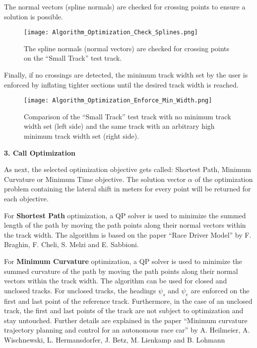 The normal vectors (spline normals) are checked for crossing points to ensure a solution is possible.
\begin{figure}[H]
    \centering
    \texttt{[image: Algorithm\_Optimization\_Check\_Splines.png]}
    \caption{The spline normals (normal vectors) are checked for crossing points on the ``Small Track'' test track.}
    \label{fig:Optimization Algorithm Check Spline Normals for Crossing Points}
\end{figure}
Finally, if no crossings are detected, the minimum track width set by the user is enforced by inflating tighter sections until the desired track width is reached.
\begin{figure}[H]
    \centering
    \texttt{[image: Algorithm\_Optimization\_Enforce\_Min\_Width.png]}
    \caption{Comparison of the ``Small Track'' test track with no minimum track width set (left side) and the same track with an arbitrary high minimum track width set (right side).}
    \label{fig:Optimization Algorithm Enforce minimum width}
\end{figure}

\pagebreak

\textbf{3. Call Optimization}

As next, the selected optimization objective gets called: Shortest Path, Minimum Curvature or Minimum Time objective. The solution vector $\alpha$ of the optimization problem containing the lateral shift in meters for every point will be returned for each objective.

For \textbf{Shortest Path} optimization, a QP solver is used to minimize the summed length of the path by moving the path points along their normal vectors within the track width. The algorithm is based on the paper ``Race Driver Model'' by F. Braghin, F. Cheli, S. Melzi and E. Sabbioni. \cite{shortest_path}

For \textbf{Minimum Curvature} optimization, a QP solver is used to minimize the summed curvature of the path by moving the path points along their normal vectors within the track width. The algorithm can be used for closed and unclosed tracks. For unclosed tracks, the headings $\psi_s$ and $\psi_e$ are enforced on the first and last point of the reference track. Furthermore, in the case of an unclosed track, the first and last points of the track are not subject to optimization and stay untouched. Further details are explained in the paper ``Minimum curvature trajectory planning and control for an autonomous race car'' by A. Heilmeier, A. Wischnewski, L. Hermansdorfer, J. Betz, M. Lienkamp and B. Lohmann \cite{minimum_curvature_trajectory_planning}

